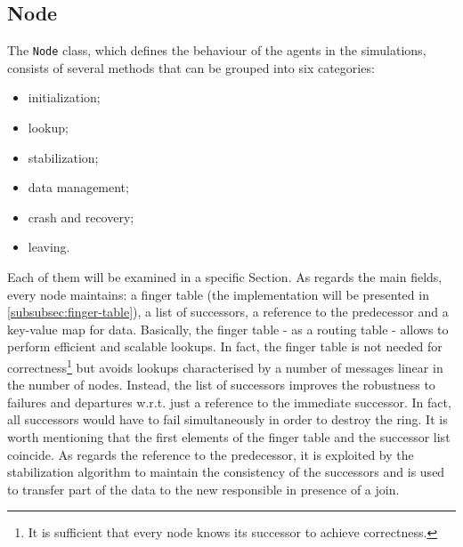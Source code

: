 \documentclass[11pt,twocolumn,letterpaper]{article}
\begin{document}
	\subsection{Node}
	\label{subsec:node}
	The \texttt{Node} class, which defines the behaviour of the agents in the simulations, consists of several methods that can be grouped into six categories:
	\vspace{-2pt}
	\begin{itemize}
		\itemsep0pt
		\item initialization;
		\item lookup;
		\item stabilization;
		\item data management;
		\item crash and recovery;
		\item leaving.
	\end{itemize}
	\vspace{-1pt}
	Each of them will be examined in a specific Section. As regards the main fields, every node maintains: a finger table (the implementation will be presented in \cref{subsubsec:finger-table}), a list of successors, a reference to the predecessor and a key-value map for data. \newline
	Basically, the finger table - as a routing table - allows to perform efficient and scalable lookups. In fact, the finger table is not needed for correctness\footnote{It is sufficient that every node knows its successor to achieve correctness.} but avoids lookups characterised by a number of messages linear in the number of nodes. \newline
	Instead, the list of successors improves the robustness to failures and departures w.r.t. just a reference to the immediate successor. In fact, all successors would have to fail simultaneously in order to destroy the ring. It is worth mentioning that the first elements of the finger table and the successor list coincide. \newline
	As regards the reference to the predecessor, it is exploited by the stabilization algorithm to maintain the consistency of the successors and is used to transfer part of the data to the new responsible in presence of a join.
	
\end{document}
